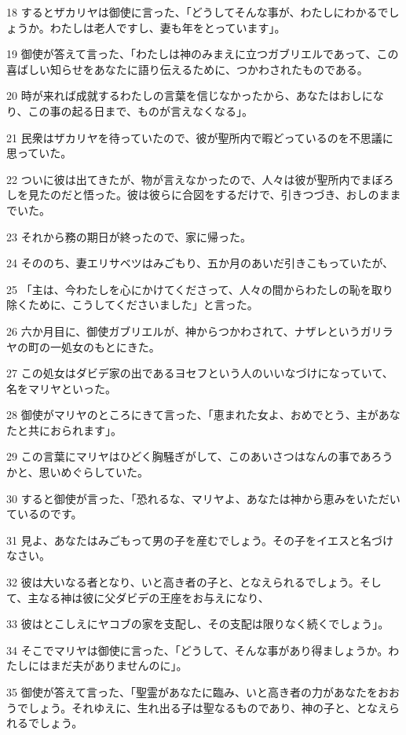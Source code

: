 \par 18 するとザカリヤは御使に言った、「どうしてそんな事が、わたしにわかるでしょうか。わたしは老人ですし、妻も年をとっています」。
\par 19 御使が答えて言った、「わたしは神のみまえに立つガブリエルであって、この喜ばしい知らせをあなたに語り伝えるために、つかわされたものである。
\par 20 時が来れば成就するわたしの言葉を信じなかったから、あなたはおしになり、この事の起る日まで、ものが言えなくなる」。
\par 21 民衆はザカリヤを待っていたので、彼が聖所内で暇どっているのを不思議に思っていた。
\par 22 ついに彼は出てきたが、物が言えなかったので、人々は彼が聖所内でまぼろしを見たのだと悟った。彼は彼らに合図をするだけで、引きつづき、おしのままでいた。
\par 23 それから務の期日が終ったので、家に帰った。
\par 24 そののち、妻エリサベツはみごもり、五か月のあいだ引きこもっていたが、
\par 25 「主は、今わたしを心にかけてくださって、人々の間からわたしの恥を取り除くために、こうしてくださいました」と言った。
\par 26 六か月目に、御使ガブリエルが、神からつかわされて、ナザレというガリラヤの町の一処女のもとにきた。
\par 27 この処女はダビデ家の出であるヨセフという人のいいなづけになっていて、名をマリヤといった。
\par 28 御使がマリヤのところにきて言った、「恵まれた女よ、おめでとう、主があなたと共におられます」。
\par 29 この言葉にマリヤはひどく胸騒ぎがして、このあいさつはなんの事であろうかと、思いめぐらしていた。
\par 30 すると御使が言った、「恐れるな、マリヤよ、あなたは神から恵みをいただいているのです。
\par 31 見よ、あなたはみごもって男の子を産むでしょう。その子をイエスと名づけなさい。
\par 32 彼は大いなる者となり、いと高き者の子と、となえられるでしょう。そして、主なる神は彼に父ダビデの王座をお与えになり、
\par 33 彼はとこしえにヤコブの家を支配し、その支配は限りなく続くでしょう」。
\par 34 そこでマリヤは御使に言った、「どうして、そんな事があり得ましょうか。わたしにはまだ夫がありませんのに」。
\par 35 御使が答えて言った、「聖霊があなたに臨み、いと高き者の力があなたをおおうでしょう。それゆえに、生れ出る子は聖なるものであり、神の子と、となえられるでしょう。
